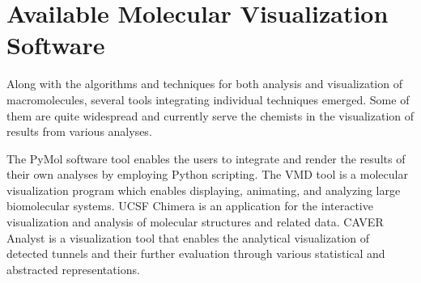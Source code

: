 \section{Available Molecular Visualization Software}
Along with the algorithms and techniques for both analysis and visualization of macromolecules, several tools integrating individual techniques emerged. Some of them are quite widespread and currently serve the chemists in the visualization of results from various analyses.

The PyMol software tool \cite{delano2002pymol} enables the users to integrate and render the results of their own analyses by employing Python scripting. The VMD tool \cite{humphrey1996vmd} is a molecular visualization program which enables displaying, animating, and analyzing large biomolecular systems. UCSF Chimera \cite{pettersen2004ucsf} is an application for the interactive visualization and analysis of molecular structures and related data. CAVER Analyst is a visualization tool \cite{kozlikova2014caver} that enables the analytical visualization of detected tunnels and their further evaluation through various statistical and abstracted representations.






